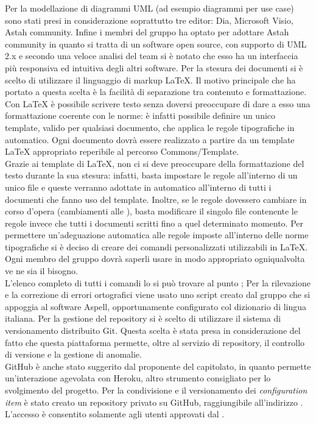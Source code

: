  \label{app:strumenti}
Per la modellazione di diagrammi UML (ad esempio diagrammi per use case) sono stati presi in considerazione soprattutto tre editor: Dia, Microsoft Visio, Astah community. Infine i membri del gruppo \groupname{} ha optato per adottare Astah community in quanto si tratta di un software open source, con supporto di UML 2.x e secondo una veloce analisi del team si è notato che esso ha un interfaccia più responsiva ed intuitiva degli altri software.
	Per la stesura dei documenti si è scelto di utilizzare il linguaggio di markup \LaTeX{}.  Il motivo principale che ha portato a questa scelta è la facilità di separazione tra contenuto e formattazione. Con \LaTeX{} è possibile scrivere testo senza doversi preoccupare di dare a esso una formattazione coerente con le norme: è infatti possibile definire un unico template, valido per qualsiasi documento, che applica le regole tipografiche in automatico.
				Ogni documento dovrà essere realizzato a partire da un template \LaTeX{} appropriato reperibile al percorso Commons/Template.\\
				Grazie ai template di \LaTeX{}, non ci si deve preoccupare della formattazione del testo durante la sua stesura: infatti, basta impostare le regole all’interno di un unico file e queste verranno adottate in automatico all’interno di tutti i documenti che fanno uso del template. Inoltre, se le regole dovessero cambiare in corso d’opera (cambiamenti alle ), basta modificare il singolo file contenente le regole invece che tutti i documenti scritti fino a quel determinato momento.
				Per permettere un’adeguazione automatica alle regole imposte all’interno delle norme tipografiche si è deciso di creare dei comandi personalizzati utilizzabili in \LaTeX{}. Ogni membro del gruppo dovrà saperli usare in modo appropriato ogniqualvolta ve ne sia il bisogno.\\
				L’elenco completo di tutti i comandi lo si può trovare al punto ;
			Per la rilevazione e la correzione di errori ortografici viene usato uno script creato dal gruppo \groupname{} che si appoggia al software Aspell, opportunamente configurato col dizionario di lingua italiana.
\label{sec:SceltaRepository}
				Per la gestione del repository si è scelto di utilizzare il sistema di versionamento distribuito Git. Questa scelta è stata presa in considerazione del fatto che questa piattaforma permette, oltre al servizio di repository, il controllo di versione e la gestione di anomalie. \\
				GitHub è anche stato suggerito dal proponente del capitolato, in quanto permette un'interazione agevolata con Heroku, altro strumento consigliato per lo svolgimento del progetto. 
					Per la condivisione e il versionamento dei \textit{configuration item} è stato creato un repository privato su GitHub, raggiungibile all’indirizzo . L’accesso è consentito solamente agli utenti approvati dal .
					
